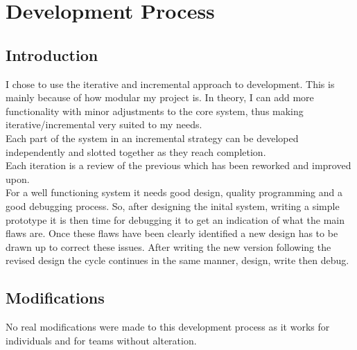 \chapter{Development Process}

\section{Introduction}
I chose to use the iterative and incremental approach to development.  This is mainly because of how modular my project is.  In theory, I can add more functionality with minor adjustments to the core system, thus making iterative/incremental very suited to my needs.
\\Each part of the system in an incremental strategy can be developed independently and slotted together as they reach completion.
\\Each iteration is a review of the previous which has been reworked and improved upon.
\\For a well functioning system it needs good design, quality programming and a good debugging process.  So, after designing the inital system, writing a simple prototype it is then time for debugging it to get an indication of what the main flaws are.  Once these flaws have been clearly identified a new design has to be drawn up to correct these issues.  After writing the new version following the revised design the cycle continues in the same manner, design, write then debug.


\section{Modifications}
No real modifications were made to this development process as it works for individuals and for teams without alteration.


